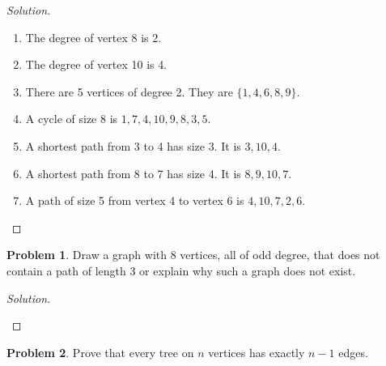 \documentclass[12pt]{article}
\theoremstyle{definition}
\newtheorem{problem-internal}{Problem}[]
\newenvironment{problem}{
  \medskip
  \begin{problem-internal}
}{
\end{problem-internal}
}
\newenvironment{solution}{
  \begin{proof}[Solution]
    \vspace{-8px}
    \setlength{\parskip}{4px}
    \setlength{\parindent}{0px}
}{
\end{proof}
}
\begin{document}
  \begin{solution}
    \hfill
    \begin{enumerate}[label={\alph*.}]
      \item The degree of vertex 8 is 2.
      \item The degree of vertex 10 is 4.
      \item There are 5 vertices of degree 2. They are \(\{1, 4, 6, 8, 9\}\).
      \item A cycle of size 8 is \(1, 7, 4, 10, 9, 8, 3, 5\).
      \item A shortest path from 3 to 4 has size 3. It is \(3, 10, 4\).
      \item A shortest path from 8 to 7 has size 4. It is \(8, 9, 10, 7\).
      \item A path of size 5 from vertex 4 to vertex 6 is \(4, 10, 7, 2, 6\).
    \end{enumerate}
  \end{solution}

  \begin{problem}
    Draw a graph with 8 vertices, all of odd degree, that does not contain a path of length 3 or explain why such a graph does not exist.
  \end{problem}

  \begin{solution}
    \hfill
    \begin{figure}[H]
      \centering

    \end{figure}
  \end{solution}

  \begin{problem}
    Prove that every tree on \(n\) vertices has exactly \(n-1\) edges.
  \end{problem}
\end{document}
